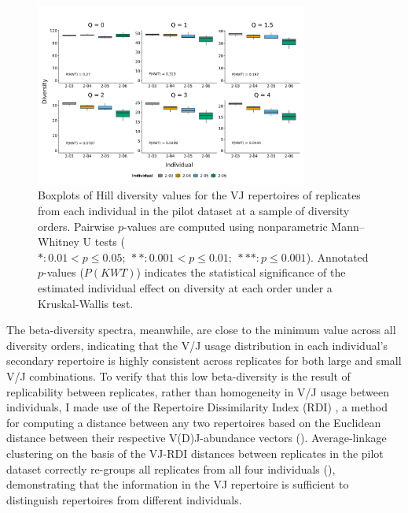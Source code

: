 \begin{figure}
\centering
\includegraphics[width = 0.8\textwidth]{_Figures/png/pilot-vj-diversity-solo-box}
\caption{Boxplots of Hill diversity values for the VJ repertoires of replicates from each individual in the \igseq pilot dataset at a sample of diversity orders. Pairwise $p$-values are computed using nonparametric Mann–Whitney U tests ($*: 0.01 < p \leq 0.05;~**: 0.001 < p \leq 0.01;~***: p \leq 0.001$). Annotated $p$-values ($P(KWT)$) indicates the statistical significance of the estimated individual effect on diversity at each order under a Kruskal-Wallis test.} %
\label{fig:igseq-pilot-clone-diversity-solo-box}
\end{figure}

The beta-diversity spectra, meanwhile, are close to the minimum value across all diversity orders, indicating that the V/J usage distribution in each individual's secondary repertoire is highly consistent across replicates for both large and small V/J combinations. To verify that this low beta-diversity is the result of replicability between replicates, rather than homogeneity in V/J usage between individuals, I made use of the Repertoire Dissimilarity Index (RDI) \parencite{bolen2017rdi}, a method for computing a distance between any two repertoires based on the Euclidean distance between their respective V(D)J-abundance vectors (). Average-linkage clustering on the basis of the VJ-RDI distances between replicates in the pilot dataset correctly re-groups all replicates from all four individuals (), demonstrating that the information in the VJ repertoire is sufficient to distinguish repertoires from different individuals.

